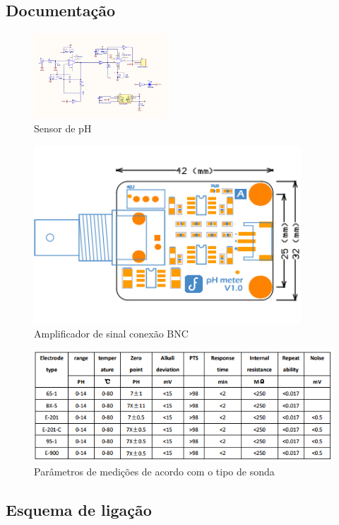 \subsection{Documentação}

\begin{figure}[H]
	\centering
	\includegraphics[width=5cm]{figuras/sensor_ph.png}
	\caption{Sensor de pH}
	\label{sensor_ph}
\end{figure}

\begin{figure}[H]
	\centering
	\includegraphics[width=10cm]{figuras/amplificador.png}
	\caption{Amplificador de sinal conexão BNC}
	\label{amplificador}
\end{figure}

\begin{figure}[H]
	\centering
	\includegraphics[width=15cm]{figuras/parametros_medicoes.png}
	\caption{Parâmetros de medições de acordo com o tipo de sonda}
	\label{parametros_medicoes}
\end{figure}

\subsection{Esquema de ligação}

